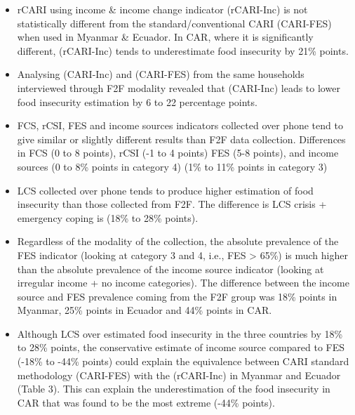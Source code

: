 \documentclass[11pt,harvard]{article}
\begin{document}
\begin{itemize}[label=--, left=1.5em]
	\item[1]	rCARI using income \& income change indicator (rCARI-Inc) is not statistically different from the standard/conventional CARI (CARI-FES) when used in Myanmar \& Ecuador. In CAR, where it is significantly different, (rCARI-Inc) tends to underestimate food insecurity by 21\% points. 
	
	\item[2]	Analysing (CARI-Inc) and (CARI-FES) from the same households interviewed through F2F modality revealed that (CARI-Inc) leads to lower food insecurity estimation by 6 to 22 percentage points. 
	
	\item[3]	FCS, rCSI, FES and income sources indicators collected over phone tend to give similar or slightly different results than F2F data collection. Differences in FCS (0 to 8 points), rCSI (-1 to 4 points) FES (5-8 points), and income sources (0 to 8\% points in category 4) (1\% to 11\% points in category 3)
	
	\item[4]	LCS collected over phone tends to produce higher estimation of food insecurity than those collected from F2F. The difference is LCS crisis + emergency coping is (18\% to 28\% points).
	
	\item[5]	Regardless of the modality of the collection, the absolute prevalence of the FES indicator (looking at category 3 and 4, i.e., FES > 65\%) is much higher than the absolute prevalence of the income source indicator (looking at irregular income + no income categories). The difference between the income source and FES prevalence coming from the F2F group was 18\% points in Myanmar, 25\% points in Ecuador and 44\% points in CAR. 
	
	\item[6]	Although LCS over estimated food insecurity in the three countries by 18\% to 28\% points, the conservative estimate of income source compared to FES (-18\% to -44\% points) could explain the equivalence between CARI standard methodology (CARI-FES) with the (rCARI-Inc) in Myanmar and Ecuador (Table 3). This can explain the underestimation of the food insecurity in CAR that was found to be the most extreme (-44\% points). 
\end{itemize}


\pagebreak

\end{document}
